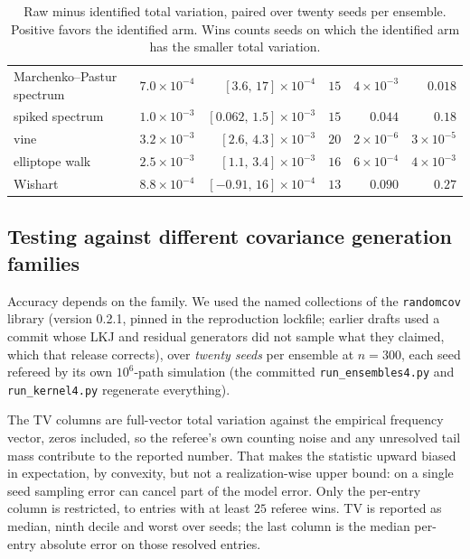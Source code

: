 \documentclass[11pt]{article}
\begin{document}
\begin{table}[h]
\begin{tabular}{lrrrrr}
Marchenko--Pastur spectrum & $7.0\times10^{-4}$ & $[3.6,\,17]\times10^{-4}$ & $15$ & $4\times10^{-3}$ & $0.018$\\
spiked spectrum & $1.0\times10^{-3}$ & $[0.062,\,1.5]\times10^{-3}$ & $15$ & $0.044$ & $0.18$\\
vine & $3.2\times10^{-3}$ & $[2.6,\,4.3]\times10^{-3}$ & $20$ & $2\times10^{-6}$ & $3\times10^{-5}$\\
elliptope walk & $2.5\times10^{-3}$ & $[1.1,\,3.4]\times10^{-3}$ & $16$ & $6\times10^{-4}$ & $4\times10^{-3}$\\
Wishart & $8.8\times10^{-4}$ & $[-0.91,\,16]\times10^{-4}$ & $13$ & $0.090$ & $0.27$\\
\bottomrule
\end{tabular}
\caption{Raw minus identified total variation, paired over twenty seeds
per ensemble. Positive favors the identified arm. Wins counts seeds on
which the identified arm has the smaller total variation.}\label{tab:paired}
\end{table}


\subsection{Testing against different covariance generation families}

Accuracy depends on the family. We used the named collections of the \texttt{randomcov} library
(version 0.2.1, pinned in the reproduction lockfile; earlier drafts used
a commit whose LKJ and residual generators did not sample what they
claimed, which that release corrects), over \emph{twenty seeds} per ensemble at $n=300$,
each seed refereed by its own $10^6$-path simulation (the committed
\texttt{run\_ensembles4.py} and \texttt{run\_kernel4.py} regenerate
everything).

The TV columns are full-vector total variation against the empirical
frequency vector, zeros included, so the referee's own counting noise and
any unresolved tail mass contribute to the reported number. That makes
the statistic upward biased in expectation, by convexity, but not a
realization-wise upper bound: on a single seed sampling error can cancel
part of the model error. Only the per-entry column is restricted, to
entries with at least $25$ referee wins. TV is reported as median, ninth
decile and worst over seeds; the last column is the median per-entry
absolute error on those resolved entries.
\end{document}
